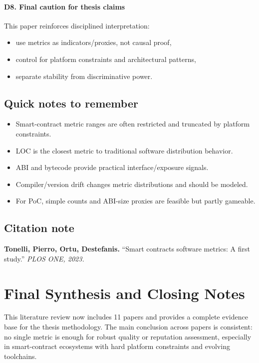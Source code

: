\documentclass[11pt,a4paper]{article}
\begin{document}
\paragraph{D8. Final caution for thesis claims}
This paper reinforces disciplined interpretation:
\begin{itemize}[leftmargin=*]
  \item use metrics as indicators/proxies, not causal proof,
  \item control for platform constraints and architectural patterns,
  \item separate stability from discriminative power.
\end{itemize}

\subsection{Quick notes to remember}
\begin{itemize}[leftmargin=*]
  \item Smart-contract metric ranges are often restricted and truncated by platform constraints.
  \item LOC is the closest metric to traditional software distribution behavior.
  \item ABI and bytecode provide practical interface/exposure signals.
  \item Compiler/version drift changes metric distributions and should be modeled.
  \item For PoC, simple counts and ABI-size proxies are feasible but partly gameable.
\end{itemize}

\subsection{Citation note}
\noindent\textbf{Tonelli, Pierro, Ortu, Destefanis.} ``Smart contracts software metrics: A first study.'' \textit{PLOS ONE, 2023.}

\newpage
\section{Final Synthesis and Closing Notes}
This literature review now includes 11 papers and provides a complete evidence base for the thesis methodology. The main conclusion across papers is consistent: no single metric is enough for robust quality or reputation assessment, especially in smart-contract ecosystems with hard platform constraints and evolving toolchains.
\end{document}
